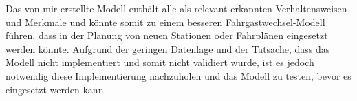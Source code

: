 Das von mir erstellte Modell enthält alle als relevant erkannten Verhaltensweisen und Merkmale und könnte somit zu einem besseren Fahrgastwechsel-Modell führen, dass in der Planung von neuen Stationen oder Fahrplänen eingesetzt werden könnte. Aufgrund der geringen Datenlage und der Tatsache, dass das Modell nicht implementiert und somit nicht validiert wurde, ist es jedoch notwendig diese Implementierung nachzuholen und das Modell zu testen, bevor es eingesetzt werden kann.